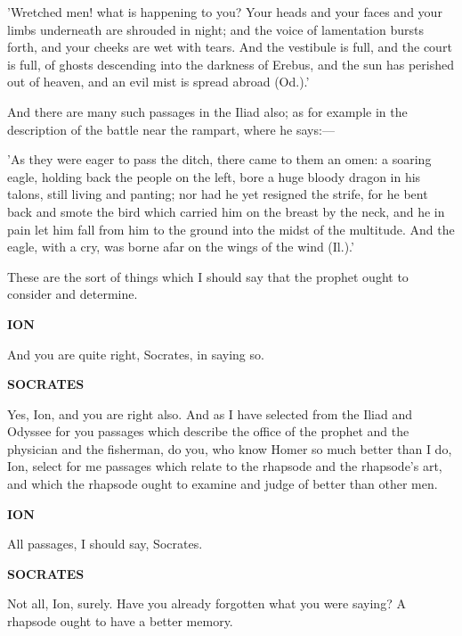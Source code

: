 \documentclass[11pt,letter]{article}
\begin{document}
\par  'Wretched men! what is happening to you? Your heads and your faces and your limbs underneath are shrouded in night; and the voice of lamentation bursts forth, and your cheeks are wet with tears. And the vestibule is full, and the court is full, of ghosts descending into the darkness of Erebus, and the sun has perished out of heaven, and an evil mist is spread abroad (Od.).'

\par  And there are many such passages in the Iliad also; as for example in the description of the battle near the rampart, where he says:—

\par  'As they were eager to pass the ditch, there came to them an omen: a soaring eagle, holding back the people on the left, bore a huge bloody dragon in his talons, still living and panting; nor had he yet resigned the strife, for he bent back and smote the bird which carried him on the breast by the neck, and he in pain let him fall from him to the ground into the midst of the multitude. And the eagle, with a cry, was borne afar on the wings of the wind (Il.).'

\par  These are the sort of things which I should say that the prophet ought to consider and determine.

\par \textbf{ION}
\par   And you are quite right, Socrates, in saying so.

\par \textbf{SOCRATES}
\par   Yes, Ion, and you are right also. And as I have selected from the Iliad and Odyssee for you passages which describe the office of the prophet and the physician and the fisherman, do you, who know Homer so much better than I do, Ion, select for me passages which relate to the rhapsode and the rhapsode's art, and which the rhapsode ought to examine and judge of better than other men.

\par \textbf{ION}
\par   All passages, I should say, Socrates.

\par \textbf{SOCRATES}
\par   Not all, Ion, surely. Have you already forgotten what you were saying? A rhapsode ought to have a better memory.
\end{document}

